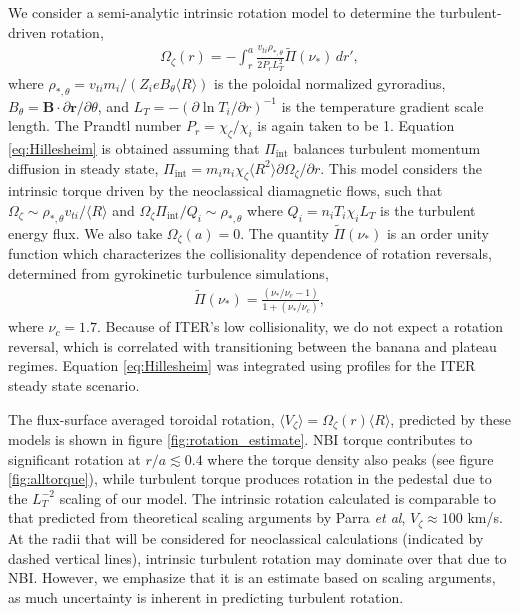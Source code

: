 \documentclass[aip, pop, preprint]{revtex4-1}
\begin{document}
We consider a semi-analytic intrinsic rotation model to determine the turbulent-driven rotation,\cite{Hillesheim2015}
\begin{gather}
\Omega_{\zeta}(r) = - \int_{r}^a \frac{v_{ti} \rho_{*,\theta}} {2 P_r L_T^2} \widetilde{\Pi} (\nu_*) \, d r',
\label{eq:Hillesheim}
\end{gather} 
where $\rho_{*,\theta} = v_{ti} m_i/(Z_i e B_{\theta} \langle R \rangle)$ is the poloidal normalized gyroradius, $B_{\theta} = \bm{B} \cdot \partial \bm{r}/\partial \theta$, and $L_T = - \left( \partial \ln T_i/ \partial r \right)^{-1}$ is the temperature gradient scale length. The Prandtl number $P_r = \chi_{\zeta}/\chi_i$ is again taken to be 1. Equation \ref{eq:Hillesheim} is obtained assuming that $\Pi_{\mathrm{int}}$ balances turbulent momentum diffusion in steady state, $\Pi_{\mathrm{int}} = m_i n_i \chi_{\zeta} \langle R^2 \rangle \partial \Omega_{\zeta}/\partial r$. This model considers the intrinsic torque driven by the neoclassical diamagnetic flows, such that $\Omega_{\zeta} \sim \rho_{*,\theta} v_{ti}/\langle R \rangle$ and $\Omega_{\zeta} \Pi_{\mathrm{int}}/Q_i \sim \rho_{*, \theta}$ where $Q_i = n_i T_i \chi_i L_T$ is the turbulent energy flux. We also take $\Omega_{\zeta}(a) = 0$. The quantity $\widetilde{\Pi} (\nu_*)$ is an order unity function which characterizes the collisionality dependence of rotation reversals, determined from gyrokinetic turbulence simulations,\cite{Barnes2013}
\begin{gather}
\widetilde{\Pi} (\nu_*) = \frac{(\nu_*/\nu_c -1)}{1 + (\nu_*/\nu_c)},
\end{gather}
where $\nu_c = 1.7$. Because of ITER's low collisionality, we do not expect a rotation reversal, which is correlated with transitioning between the banana and plateau regimes. Equation \ref{eq:Hillesheim} was integrated using profiles for the ITER steady state scenario. 

The flux-surface averaged toroidal rotation, $\langle V_{\zeta} \rangle = \Omega_{\zeta}(r) \langle R \rangle$, predicted by these models is shown in figure \ref{fig:rotation_estimate}. NBI torque contributes to significant rotation at $r/a \lesssim 0.4$ where the torque density also peaks (see figure \ref{fig:alltorque}), while turbulent torque produces rotation in the pedestal due to the $L_T^{-2}$ scaling of our model.  The intrinsic rotation calculated is comparable to that predicted from theoretical scaling arguments by Parra \textit{et al},\cite{Parra2012} $V_{\zeta} \approx 100$ km/s. At the radii that will be considered for neoclassical calculations (indicated by dashed vertical lines), intrinsic turbulent rotation may dominate over that due to NBI. However, we emphasize that it is an estimate based on scaling arguments, as much uncertainty is inherent in predicting turbulent rotation. 
\end{document}
